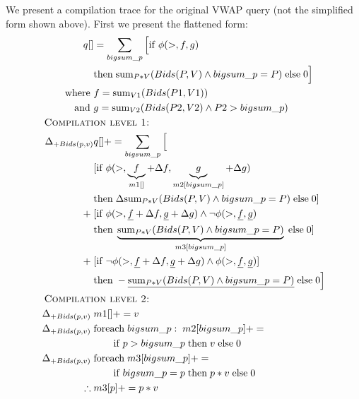 \begin{example}
We present a compilation trace for the original VWAP query (not the simplified
form shown above). First we present the flattened form:
\begin{align*}
q[] & = \sum_{bigsum\_p}{\Big[\algif \; \phi(>, f, g) }\\
    & \algthen \; \algsum_{P*V}(Bids(P,V) \wedge bigsum\_p = P) \;
      \algelse \; 0 \Big]\\
\mbox{where } & f = \algsum_{V1}(Bids(P1,V1))\\
\mbox{and } & g = \algsum_{V2}(Bids(P2,V2) \wedge P2 > bigsum\_p)
\\
& \hspace{-1.75cm}\mbox{\sc Compilation level 1:}\\
\Delta_{+Bids(p,v)} & q[] += \sum_{bigsum\_p} \Big[ \\
& [ \algif \; \phi(>,\underbrace{f}_{m1[]}+\Delta f, \underbrace{g}_{m2[bigsum\_p]}+\Delta g) \; \\
& \algthen \; \Delta \algsum_{P*V}(Bids(P,V) \wedge bigsum\_p = P) \;
    \algelse \; 0 ] \\
+ \; & [ \algif \; \phi(>,\underline{f}+\Delta f, \underline{g}+\Delta g) \wedge
    \neg\phi(>,\underline{f},\underline{g}) \\
& \algthen \; \underbrace{\algsum_{P*V}(Bids(P,V) \wedge
    bigsum\_p = P)}_{m3[bigsum\_p]} \;
    \algelse \; 0 ] \\
+ \; & [ \algif \; \neg \phi(>, \underline{f}+\Delta f, \underline{g}+\Delta g)
    \wedge \phi(>,\underline{f},\underline{g}) ] \\
& \algthen \; - \underline{\algsum_{P*V}(Bids(P,V) \wedge bigsum\_p = P)} \;
    \algelse \; 0
\Big]\\
& \hspace{-1.75cm}\mbox{\sc Compilation level 2:}\\
\Delta_{+Bids(p,v)} \; & m1[] += v\\
\Delta_{+Bids(p,v)} \; & \algforeach \; bigsum\_p : \; m2[bigsum\_p] += \\
& \qquad \algif \; p > bigsum\_p \;\algthen \; v \; \algelse \; 0 \\
\Delta_{+Bids(p,v)} \; & \algforeach \; m3[bigsum\_p] += \\
& \qquad \algif \; bigsum\_p = p \; \algthen \; p*v \; \algelse \; 0\\
\therefore \; & m3[p] += p*v
\end{align*}
\end{example}

